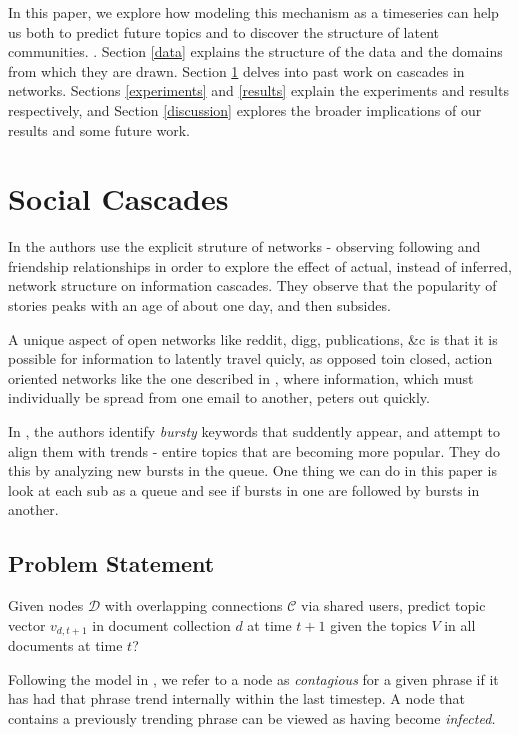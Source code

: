 \documentclass{article} %
\begin{document}
In this paper, we explore how modeling this mechanism as a timeseries can help us both to predict future topics and to discover the structure of latent communities. . Section \ref{data} explains the structure of the data and the domains from which they are drawn. Section \ref{cascades} delves into past work on cascades in networks. Sections \ref{experiments} and \ref{results} explain the experiments and results respectively, and Section \ref{discussion} explores the broader implications of our results and some future work. 

\section{Social Cascades}
\label{cascades}

In \cite{info_contag} the authors use the explicit struture of networks - observing following and friendship relationships in order to explore the effect of actual, instead of inferred, network structure on information cascades. They observe that the popularity of stories peaks with an age of about one day, and then subsides. 

A unique aspect of open networks like reddit, digg, publications, \&c is that it is possible for information to latently travel quicly, as opposed toin closed, action oriented networks like the one described in \cite{viral_dynamics}, where information, which must individually be spread from one email to another, peters out quickly.

In \cite{twitter_trend}, the authors identify \textit{bursty} keywords that suddently appear, and attempt to align them with trends - entire topics that are becoming more popular. They do this by analyzing new bursts in the queue. One thing we can do in this paper is look at each sub as a queue and see if bursts in one are followed by bursts in another.


\subsection{Problem Statement}

Given nodes $\mathcal{D}$ with overlapping connections $\mathcal{C}$ via shared users, predict topic vector $v_{d,t+1}$ in document collection $d$ at time $t+1$ given the topics $V$ in all documents at time $t$?


Following the model in \cite{influential}, we refer to a node as \textit{contagious} for a given phrase if it has had that phrase trend internally within the last timestep. A node that contains a previously trending phrase can be viewed as having become \textit{infected.} 
\end{document}
